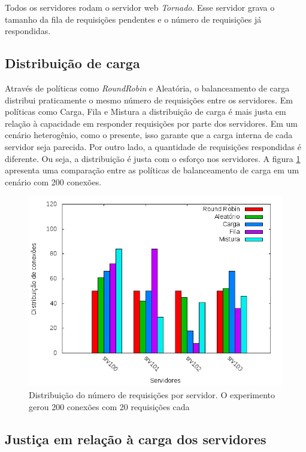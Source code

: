 Todos os servidores rodam o servidor web \emph{Tornado}\citep{tornado}. 
Esse servidor grava o tamanho da fila de requisições pendentes e o número de 
requisições já respondidas.


\subsection{Distribuição de carga}

Através de políticas como \emph{RoundRobin} e Aleatória, o balanceamento de 
carga distribui praticamente o mesmo número de requisições entre
os servidores.
Em políticas como Carga, Fila e Mistura a distribuição de carga é mais justa
em relação à capacidade em responder requisições por parte dos servidores.
Em um cenário heterogênio, como o presente, isso garante que a carga interna
de cada servidor seja parecida.
Por outro lado, a quantidade de requisições respondidas é diferente.
Ou seja, a distribuição é justa com o esforço nos servidores.
A figura \ref{fig:balancer-distribution} apresenta uma comparação entre as 
políticas de balanceamento de carga em um cenário com 200 conexões.

\begin{figure}[htb!]
    \centering
    \includegraphics[width=\linewidth]{img/balancer-distribution.png}
    \caption{Distribuição do número de requisições por servidor. O experimento
    gerou 200 conexões com 20 requisições cada}
    \label{fig:balancer-distribution}
\end{figure}

\subsection{Justiça em relação à carga dos servidores}

